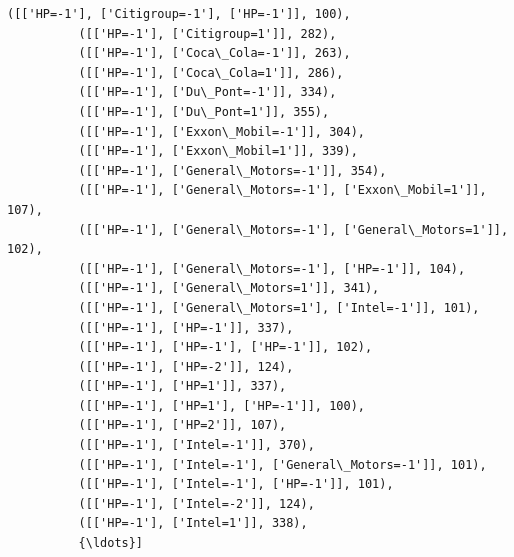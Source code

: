 \documentclass[11pt]{article}
\begin{document}
\begin{Verbatim}[commandchars=\\\{\}]
          ([['HP=-1'], ['Citigroup=-1'], ['HP=-1']], 100),
          ([['HP=-1'], ['Citigroup=1']], 282),
          ([['HP=-1'], ['Coca\_Cola=-1']], 263),
          ([['HP=-1'], ['Coca\_Cola=1']], 286),
          ([['HP=-1'], ['Du\_Pont=-1']], 334),
          ([['HP=-1'], ['Du\_Pont=1']], 355),
          ([['HP=-1'], ['Exxon\_Mobil=-1']], 304),
          ([['HP=-1'], ['Exxon\_Mobil=1']], 339),
          ([['HP=-1'], ['General\_Motors=-1']], 354),
          ([['HP=-1'], ['General\_Motors=-1'], ['Exxon\_Mobil=1']], 107),
          ([['HP=-1'], ['General\_Motors=-1'], ['General\_Motors=1']], 102),
          ([['HP=-1'], ['General\_Motors=-1'], ['HP=-1']], 104),
          ([['HP=-1'], ['General\_Motors=1']], 341),
          ([['HP=-1'], ['General\_Motors=1'], ['Intel=-1']], 101),
          ([['HP=-1'], ['HP=-1']], 337),
          ([['HP=-1'], ['HP=-1'], ['HP=-1']], 102),
          ([['HP=-1'], ['HP=-2']], 124),
          ([['HP=-1'], ['HP=1']], 337),
          ([['HP=-1'], ['HP=1'], ['HP=-1']], 100),
          ([['HP=-1'], ['HP=2']], 107),
          ([['HP=-1'], ['Intel=-1']], 370),
          ([['HP=-1'], ['Intel=-1'], ['General\_Motors=-1']], 101),
          ([['HP=-1'], ['Intel=-1'], ['HP=-1']], 101),
          ([['HP=-1'], ['Intel=-2']], 124),
          ([['HP=-1'], ['Intel=1']], 338),
          {\ldots}]
\end{Verbatim}
            
\end{document}
